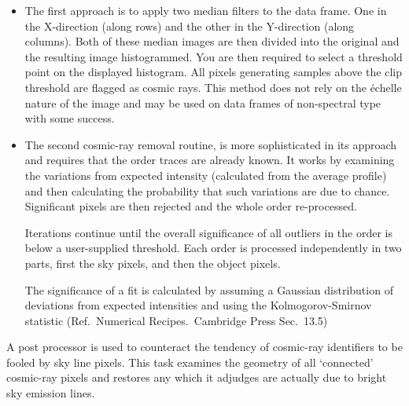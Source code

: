 \documentclass[twoside,11pt]{article}
\renewcommand{\_}{\texttt{\symbol{95}}}
\newcommand{\myindex}[1]{\index{#1}}
\newcommand{\myindex}[1]{}
\begin{document}
\begin{itemize}

\item The first approach is to apply two median filters to the data
      frame. One in the X-direction (along rows) and the other in the
      Y-direction (along columns). Both of these median images are then
      divided into the original and the resulting image histogrammed. You
      are then required to select a threshold point on the displayed
      histogram. All pixels generating samples above the clip threshold are
      flagged as cosmic rays. This method does not rely on the \'{e}chelle
      nature of the image and may be used on data frames of non-spectral
      type with some success.

\item The second cosmic-ray removal routine,  is more sophisticated in
      its approach and requires that the order traces are already known. It
      works by examining the variations from expected intensity (calculated
      from the average profile) and then calculating the probability that
      such variations are due to chance. Significant pixels are then
      rejected and the whole order re-processed.

      Iterations continue until the overall significance of all outliers in
      the order is below a user-supplied threshold. Each order is processed
      independently in two parts,  first the sky pixels,  and then the
      object pixels.

      The significance of a fit is calculated by assuming a Gaussian
      distribution of deviations from expected intensities and using the
      Kolmogorov-Smirnov statistic (Ref.\ Numerical Recipes.\ Cambridge Press
      Sec.~13.5)

\end{itemize}

A post processor is used to counteract the tendency of cosmic-ray
identifiers to be fooled by sky line pixels. This task examines the
geometry of all `connected' cosmic-ray pixels and restores any which it
adjudges are actually due to bright sky emission lines.
\myindex{Sky lines}
\end{document}
